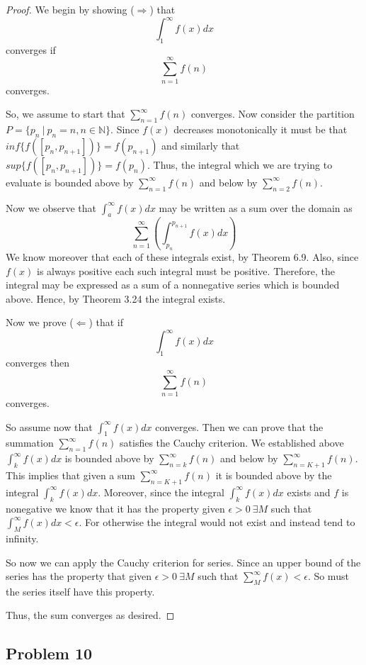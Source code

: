\documentclass[12pt]{article}
\begin{document}
\begin{proof}
We begin by showing ($\Rightarrow$) that 
\[\int_1^\infty f(x) dx\]
converges if 
\[\sum_{n=1}^\infty f(n)\]
converges.

So, we assume to start that $\sum_{n=1}^\infty f(n)$ converges. Now consider the partition $P=\{p_n\ |\ p_n=n, n \in \mathbb{N}\}$. Since $f(x)$ decreases monotonically it must be that $inf\{f([p_n,p_{n+1}])\}=f(p_{n+1})$ and similarly that $sup\{f([p_n,p_{n+1}])\}=f(p_{n})$. Thus, the integral which we are trying to evaluate is bounded above by $\sum_{n=1}^\infty f(n)$ and below by $\sum_{n=2}^\infty f(n)$. 

Now we observe that $\int_a^\infty f(x) dx$ may be written as a sum over the domain as 
\[\sum_{n=1}^\infty \left( \int_{p_n}^{p_{n+1}} f(x) dx \right)\]
We know moreover that each of these integrals exist, by Theorem 6.9. Also, since $f(x)$ is always positive each such integral must be positive. Therefore, the integral may be expressed as a sum of a nonnegative series which is bounded above. Hence, by Theorem 3.24 the integral exists.

Now we prove ($\Leftarrow$) that if
\[\int_1^\infty f(x) dx\]
converges then 
\[\sum_{n=1}^\infty f(n)\]
converges.

So assume now that $\int_1^\infty f(x) dx$ converges. Then we can prove that the summation $\sum_{n=1}^\infty f(n)$ satisfies the Cauchy criterion. We established above $\int_k^\infty f(x) dx$ is bounded above by $\sum_{n=k}^\infty f(n)$ and below by $\sum_{n=K+1}^\infty f(n)$. This implies that given a sum $\sum_{n=K+1}^\infty f(n)$ it is bounded above by the integral $\int_k^\infty f(x) dx$. Moreover, since the integral  $\int_k^\infty f(x) dx$ exists and $f$ is nonegative we know that it has the property given $\epsilon>0\  \exists M$ such that $\int_M^\infty f(x) dx< \epsilon$. For otherwise the integral would not exist and instead tend to infinity.

So now we can apply the Cauchy criterion for series. Since an upper bound of the series has the property that given $\epsilon>0\  \exists M$ such that $\sum_M^\infty f(x) < \epsilon$. So must the series itself have this property.

Thus, the sum converges as desired.

\end{proof}
\subsection{Problem 10}
\end{document}
